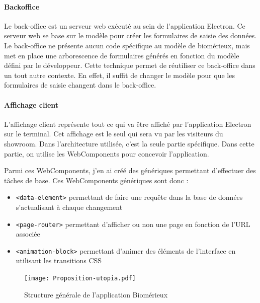 \paragraph{Backoffice} Le back-office est un serveur web exécuté au sein de l'application Electron.
Ce serveur web se base sur le modèle pour créer les formulaires de saisie des données.
Le back-office ne présente aucun code spécifique au modèle de biomérieux, mais met en place une arborescence de formulaires générés en fonction du modèle défini par le développeur.
Cette technique permet de réutiliser ce back-office dans un tout autre contexte.
En effet, il suffit de changer le modèle pour que les formulaires de saisie changent dans le back-office.

\paragraph{Affichage client} L'affichage client représente tout ce qui va être affiché par l'application Electron sur le terminal.
Cet affichage est le seul qui sera vu par les visiteurs du showroom.
Dans l'architecture utilisée, c'est la seule partie spécifique.
Dans cette partie, on utilise les WebComponents pour concevoir l'application.

Parmi ces WebComponents, j'en ai créé des génériques permettant d'effectuer des tâches de base.
Ces WebComponents génériques sont donc :
\begin{itemize}
    \item \texttt{<data-element>} permettant de faire une requête dans la base de données s'actualisant à chaque changement
    \item \texttt{<page-router>} permettant d'afficher ou non une page en fonction de l'URL associée
    \item \texttt{<animation-block>} permettant d'animer des éléments de l'interface en utilisant les transitions CSS
\end{itemize}

\begin{landscape}
    \begin{figure}[h]
        \centering
        \texttt{[image: Proposition-utopia.pdf]}
        \caption{Structure générale de l'application Biomérieux}
    \end{figure}
\end{landscape}